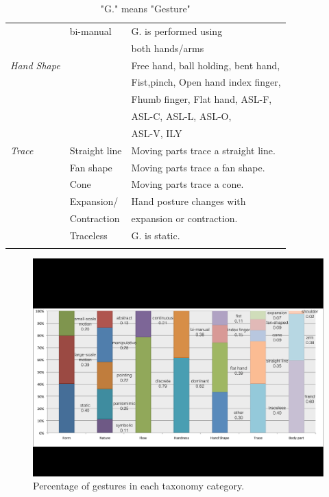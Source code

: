 \documentclass{sigchi}
\begin{document}
\begin{table}
\begin{adjustwidth}{-0.4cm}{}
\begin{tabular}{|l|l|l|}
    &bi-manual&G. is performed using \\&&both hands/arms\\
    \Xhline{4\arrayrulewidth}
    \em{Hand Shape} &&Free hand, ball holding, bent hand,\\&& Fist,pinch, Open hand
    index finger,\\&&Fhumb finger, Flat hand, ASL-F,\\&&ASL-C, ASL-L, ASL-O, \\&&ASL-V, ILY\\
    \Xhline{4\arrayrulewidth}
    \em{Trace}&Straight line&Moving parts trace a straight line.\\ \cline{2-3}
    &Fan shape&Moving parts trace a fan shape.\\ \cline{2-3}
    &Cone&Moving parts trace a cone.\\ \cline{2-3}
    &Expansion/&Hand posture changes with \\&Contraction&expansion or contraction.\\
     \cline{2-3}
    &Traceless&G. is static.\\
    \Xhline{4\arrayrulewidth}
  \end{tabular}
  \caption{"G." means "Gesture"}
  \label{tab:classificationTable}
  \end{adjustwidth}
\end{table}

\begin{figure}[!h]
\centering
\includegraphics[width=1\columnwidth]{taxonomy.pdf}
\caption{Percentage of gestures in each taxonomy category.}
\label{fig:taxonomyFigure}
\end{figure}
\end{document}
